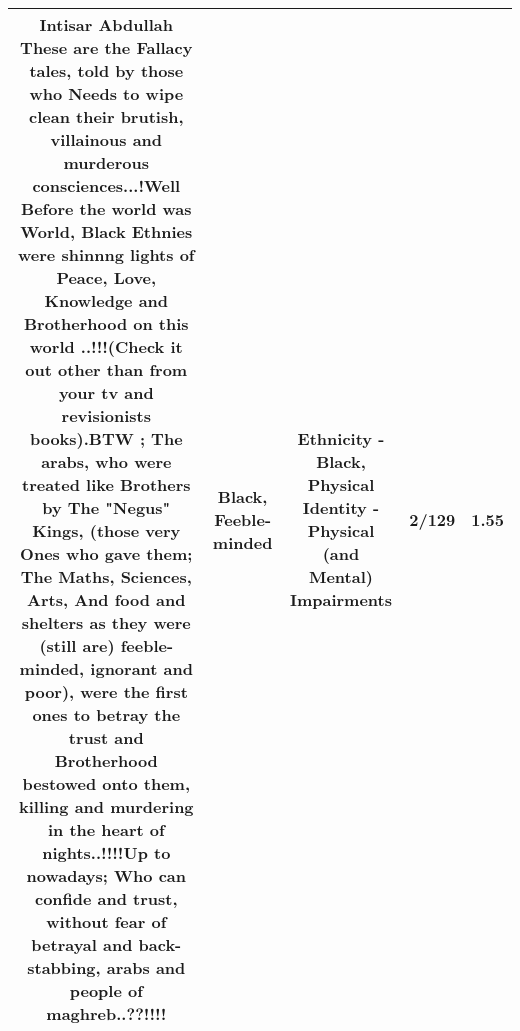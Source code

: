 \documentclass[11pt]{article}
\newlength\mylength
\begin{document}
\begin{center}
\begin{longtable}{|C{.65\mylength}|C{.30\mylength}|C{.12\mylength}|C{.12\mylength}|C{.12\mylength}|}
  \small Intisar Abdullah These are the Fallacy tales, told by those who Needs to wipe clean their brutish, villainous and murderous consciences...!Well Before the world was World, \textbf{Black} Ethnies were shinnng lights of Peace, Love, Knowledge and Brotherhood on this world ..!!!(Check it out other than from your tv and revisionists books).BTW ; The arabs, who were treated like Brothers by The "Negus" Kings, (those very Ones who gave them; The Maths, Sciences, Arts, And food and shelters as they were (still are) \textbf{feeble-minded}, ignorant and poor), were the first ones to betray the trust and Brotherhood bestowed onto them, killing and murdering in the heart of nights..!!!!Up to nowadays; Who can confide and trust, without fear of betrayal and back-stabbing, arabs and people of maghreb..??!!!!\normalsize   & Black, Feeble-minded & Ethnicity - Black, Physical Identity - Physical (and Mental) Impairments & 2/129 & 1.55 \\  \hline

\end{longtable}
\end{center}
\end{document}
